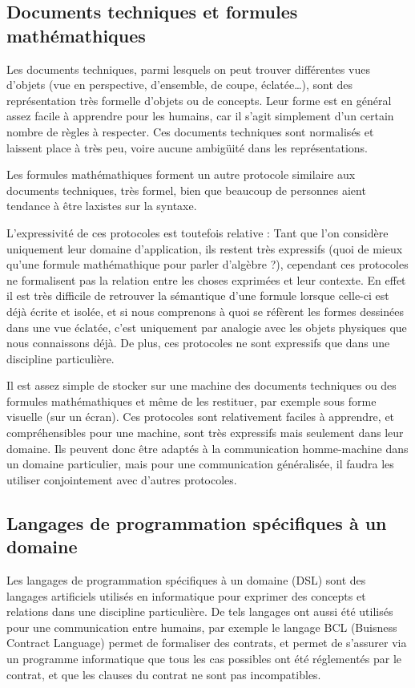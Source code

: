 \documentclass[french,a4paper]{article}
\begin{document}
\subsection{Documents techniques et formules mathémathiques}

Les documents techniques, parmi lesquels on peut trouver différentes
vues d'objets (vue en perspective, d'ensemble, de coupe, éclatée…),
sont des représentation très formelle d'objets ou de concepts. Leur
forme est en général assez facile à apprendre pour les humains, car il
s'agit simplement d'un certain nombre de règles à respecter. Ces
documents techniques sont normalisés et laissent place à très peu,
voire aucune ambigüité dans les représentations.

Les formules mathémathiques forment un autre protocole similaire aux
documents techniques, très formel, bien que beaucoup de personnes
aient tendance à être laxistes sur la syntaxe.

L'expressivité de ces protocoles est toutefois relative : Tant que
l'on considère uniquement leur domaine d'application, ils restent très
expressifs (quoi de mieux qu'une formule mathémathique pour parler
d'algèbre ?), cependant ces protocoles ne formalisent pas la relation
entre les choses exprimées et leur contexte. En effet il est très
difficile de retrouver la sémantique d'une formule lorsque celle-ci
est déjà écrite et isolée, et si nous comprenons à quoi se réfèrent
les formes dessinées dans une vue éclatée, c'est uniquement par
analogie avec les objets physiques que nous connaissons déjà. De plus,
ces protocoles ne sont expressifs que dans une discipline
particulière.

Il est assez simple de stocker sur une machine des documents
techniques ou des formules mathémathiques et même de les restituer,
par exemple sous forme visuelle (sur un écran). Ces protocoles sont
relativement faciles à apprendre, et compréhensibles pour une machine,
sont très expressifs mais seulement dans leur domaine. Ils peuvent
donc être adaptés à la communication homme-machine dans un domaine
particulier, mais pour une communication généralisée, il faudra les
utiliser conjointement avec d'autres protocoles.

\subsection{Langages de programmation spécifiques à un domaine}

Les langages de programmation spécifiques à un domaine (DSL) sont des
langages artificiels utilisés en informatique pour exprimer des
concepts et relations dans une discipline particulière. De tels
langages ont aussi été utilisés pour une communication entre humains,
par exemple le langage BCL (Buisness Contract Language) permet de
formaliser des contrats, et permet de s'assurer via un programme
informatique que tous les cas possibles ont été réglementés par le
contrat, et que les clauses du contrat ne sont pas incompatibles.
\end{document}

